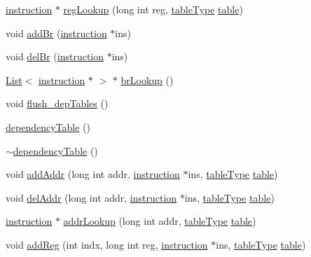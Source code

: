 \begin{DoxyCompactItemize}
\item 
\hyperlink{classinstruction}{instruction} $\ast$ \hyperlink{classdependencyTable_a38380b935c33267006d7242d1b72e62a}{regLookup} (long int reg, \hyperlink{backend_2dependencyTable_8h_ab390e08ed69004340ece1f911f48fd1b}{tableType} \hyperlink{classtable}{table})
\item 
void \hyperlink{classdependencyTable_a68cb3b1cdf38c24d1bfd5913112f6f24}{addBr} (\hyperlink{classinstruction}{instruction} $\ast$ins)
\item 
void \hyperlink{classdependencyTable_a6b94d787b12a3979b8b182c7e5bde07f}{delBr} (\hyperlink{classinstruction}{instruction} $\ast$ins)
\item 
\hyperlink{classList}{List}$<$ \hyperlink{classinstruction}{instruction} $\ast$ $>$ $\ast$ \hyperlink{classdependencyTable_a7896f0b48411dcb469ebb2647b84541c}{brLookup} ()
\item 
void \hyperlink{classdependencyTable_a8ce45687a518285a6ff32081b8d44125}{flush\_\-depTables} ()
\item 
\hyperlink{classdependencyTable_abae7a5ee69f34dfca3d0b1195b773225}{dependencyTable} ()
\item 
\hyperlink{classdependencyTable_a0b227c520264190bae8782e4f9db593a}{$\sim$dependencyTable} ()
\item 
void \hyperlink{classdependencyTable_a2152aa2490daef06772595e126e6e024}{addAddr} (long int addr, \hyperlink{classinstruction}{instruction} $\ast$ins, \hyperlink{backend_2dependencyTable_8h_ab390e08ed69004340ece1f911f48fd1b}{tableType} \hyperlink{classtable}{table})
\item 
void \hyperlink{classdependencyTable_abffec553d72068c891beb9fa8fe73440}{delAddr} (long int addr, \hyperlink{classinstruction}{instruction} $\ast$ins, \hyperlink{backend_2dependencyTable_8h_ab390e08ed69004340ece1f911f48fd1b}{tableType} \hyperlink{classtable}{table})
\item 
\hyperlink{classinstruction}{instruction} $\ast$ \hyperlink{classdependencyTable_a2f5a21dac633c810831e4759445d7c47}{addrLookup} (long int addr, \hyperlink{backend_2dependencyTable_8h_ab390e08ed69004340ece1f911f48fd1b}{tableType} \hyperlink{classtable}{table})
\item 
void \hyperlink{classdependencyTable_a09e8df2809062b427a8ff3494ecb853d}{addReg} (int indx, long int reg, \hyperlink{classinstruction}{instruction} $\ast$ins, \hyperlink{backend_2dependencyTable_8h_ab390e08ed69004340ece1f911f48fd1b}{tableType} \hyperlink{classtable}{table})
\item 

\end{DoxyCompactItemize}
